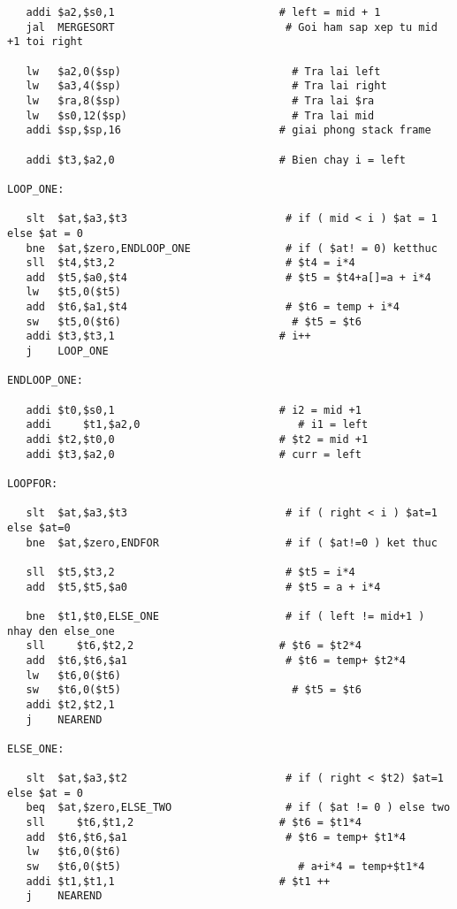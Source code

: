 \documentclass[a4paper]{article}
\begin{document}
\begin{verbatim}
   addi	$a2,$s0,1                          # left = mid + 1
   jal	MERGESORT                           # Goi ham sap xep tu mid +1 toi right

   lw	$a2,0($sp)                           # Tra lai left
   lw	$a3,4($sp)                           # Tra lai right
   lw	$ra,8($sp)                           # Tra lai $ra
   lw	$s0,12($sp)                          # Tra lai mid
   addi	$sp,$sp,16                         # giai phong stack frame

   addi	$t3,$a2,0                          # Bien chay i = left

LOOP_ONE: 

   slt	$at,$a3,$t3                         # if ( mid < i ) $at = 1 else $at = 0
   bne	$at,$zero,ENDLOOP_ONE               # if ( $at! = 0) ketthuc
   sll	$t4,$t3,2                           # $t4 = i*4
   add	$t5,$a0,$t4                         # $t5 = $t4+a[]=a + i*4
   lw	$t5,0($t5)			
   add	$t6,$a1,$t4	                        # $t6 = temp + i*4
   sw	$t5,0($t6)                           # $t5 = $t6
   addi	$t3,$t3,1                          # i++
   j	LOOP_ONE	

ENDLOOP_ONE:
	
   addi	$t0,$s0,1                          # i2 = mid +1
   addi 	$t1,$a2,0                         # i1 = left
   addi	$t2,$t0,0                          # $t2 = mid +1
   addi	$t3,$a2,0                          # curr = left

LOOPFOR:					

   slt	$at,$a3,$t3                         # if ( right < i ) $at=1 else $at=0
   bne	$at,$zero,ENDFOR                    # if ( $at!=0 ) ket thuc

   sll	$t5,$t3,2                           # $t5 = i*4
   add	$t5,$t5,$a0	                        # $t5 = a + i*4
	
   bne	$t1,$t0,ELSE_ONE                    # if ( left != mid+1 ) nhay den else_one
   sll     $t6,$t2,2                       # $t6 = $t2*4
   add	$t6,$t6,$a1                         # $t6 = temp+ $t2*4
   lw	$t6,0($t6)
   sw	$t6,0($t5)                           # $t5 = $t6
   addi	$t2,$t2,1			
   j	NEAREND

ELSE_ONE:

   slt	$at,$a3,$t2                         # if ( right < $t2) $at=1 else $at = 0
   beq	$at,$zero,ELSE_TWO                  # if ( $at != 0 ) else two
   sll     $t6,$t1,2                       # $t6 = $t1*4
   add	$t6,$t6,$a1	                        # $t6 = temp+ $t1*4
   lw	$t6,0($t6)			
   sw	$t6,0($t5)	                          # a+i*4 = temp+$t1*4
   addi	$t1,$t1,1                          # $t1 ++
   j	NEAREND


\end{verbatim}
\end{document}
